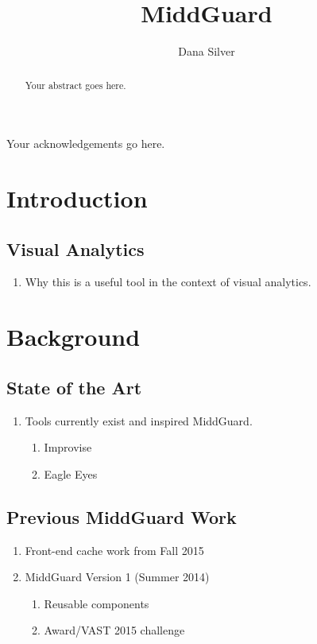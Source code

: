 \documentclass[midd]{thesis}
\title {MiddGuard}
\author {Dana Silver}
\begin{document}
\maketitle

\begin{abstract}
Your abstract goes here.
\end{abstract}

\begin{acknowledgements}
Your acknowledgements go here.
\end{acknowledgements}

\contentspage
\tablelistpage
\figurelistpage

\normalspacing \setcounter{page}{1} 

\chapter{Introduction}

\section{Visual Analytics}
\begin{enumerate}
  \item Why this is a useful tool in the context of visual analytics.
\end{enumerate}

\chapter{Background}

\section{State of the Art}
  \begin{enumerate}
    \item Tools currently exist and inspired MiddGuard.
    \begin{enumerate}
      \item Improvise
      \item Eagle Eyes
    \end{enumerate}
  \end{enumerate}

\section{Previous MiddGuard Work}
\begin{enumerate}
  \item Front-end cache work from Fall 2015
  \item MiddGuard Version 1 (Summer 2014)
  \begin{enumerate}
    \item Reusable components
    \item Award/VAST 2015 challenge
  \end{enumerate}
\end{enumerate}
\end{document}
